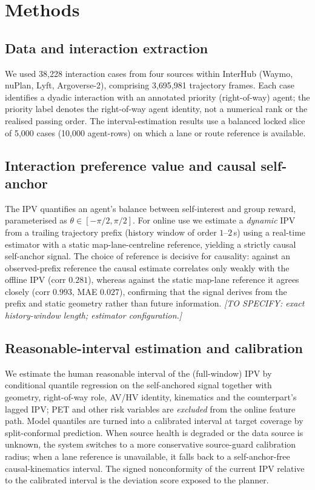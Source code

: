 \documentclass[12pt,a4paper]{article}
\begin{document}
\section{Methods}

\subsection{Data and interaction extraction}
We used 38{,}228 interaction cases from four sources within InterHub (Waymo, nuPlan, Lyft,
Argoverse-2), comprising 3{,}695{,}981 trajectory frames. Each case identifies a dyadic
interaction with an annotated priority (right-of-way) agent; the priority label denotes the
right-of-way agent identity, not a numerical rank or the realised passing order. The
interval-estimation results use a balanced locked slice of 5{,}000 cases (10{,}000
agent-rows) on which a lane or route reference is available.

\subsection{Interaction preference value and causal self-anchor}
The IPV quantifies an agent's balance between self-interest and group reward, parameterised
as $\theta\in[-\pi/2,\pi/2]$. For online use we estimate a \emph{dynamic} IPV from a trailing
trajectory prefix (history window of order $1$--$2$\,s) using a real-time estimator with a
static map-lane-centreline reference, yielding a strictly causal self-anchor signal. The
choice of reference is decisive for causality: against an observed-prefix reference the
causal estimate correlates only weakly with the offline IPV (corr $0.281$), whereas against
the static map-lane reference it agrees closely (corr $0.993$, MAE $0.027$), confirming that
the signal derives from the prefix and static geometry rather than future information.
\emph{[TO SPECIFY: exact history-window length; estimator configuration.]}

\subsection{Reasonable-interval estimation and calibration}
We estimate the human reasonable interval of the (full-window) IPV by conditional quantile
regression on the self-anchored signal together with geometry, right-of-way role, AV/HV
identity, kinematics and the counterpart's lagged IPV; PET and other risk variables are
\emph{excluded} from the online feature path. Model quantiles are turned into a calibrated
interval at target coverage by split-conformal prediction. When source health is degraded or
the data source is unknown, the system switches to a more conservative source-guard
calibration radius; when a lane reference is unavailable, it falls back to a self-anchor-free
causal-kinematics interval. The signed nonconformity of the current IPV relative to the
calibrated interval is the deviation score exposed to the planner.
\end{document}
